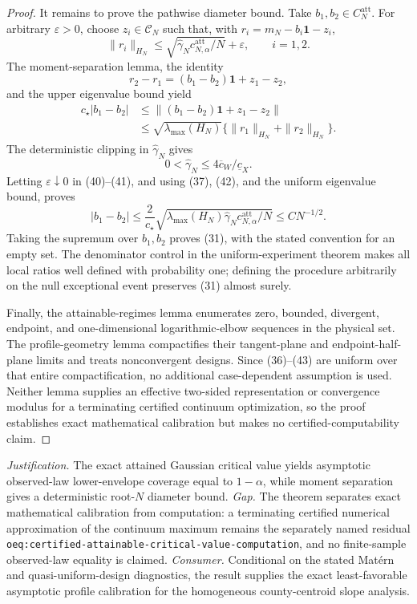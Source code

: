 \documentclass{article}
\begin{document}
\begin{proof}
It remains to prove the pathwise diameter bound.  Take \(b_1,b_2\in C_N^{\mathrm{att}}\).  For arbitrary \(\varepsilon>0\), choose \(z_i\in\mathcal C_N\) such that, with \(r_i=m_N-b_i\mathbf1-z_i\),
\[
\|r_i\|_{H_N}\le
\sqrt{\widehat\gamma_Nc_{N,\alpha}^{\mathrm{att}}/N}+\varepsilon,
\qquad i=1,2.                                                                \tag{40}
\]
The moment-separation lemma, the identity
\[
r_2-r_1=(b_1-b_2)\mathbf1+z_1-z_2,
\]
and the upper eigenvalue bound yield
\[
\begin{aligned}
c_\star|b_1-b_2|
&\le\|(b_1-b_2)\mathbf1+z_1-z_2\|\\
&\le\sqrt{\lambda_{\max}(H_N)}
   \{\|r_1\|_{H_N}+\|r_2\|_{H_N}\}.                                      \tag{41}
\end{aligned}
\]
The deterministic clipping in \(\widehat\gamma_N\) gives
\[
0<\widehat\gamma_N\le4\overline c_W/\underline c_X.                        \tag{42}
\]
Letting \(\varepsilon\downarrow0\) in (40)--(41), and using (37), (42), and the uniform eigenvalue bound, proves
\[
|b_1-b_2|\le
\frac{2}{c_\star}
\sqrt{\lambda_{\max}(H_N)\widehat\gamma_N
      c_{N,\alpha}^{\mathrm{att}}/N}
\le C N^{-1/2}.                                                               \tag{43}
\]
Taking the supremum over \(b_1,b_2\) proves (31), with the stated convention for an empty set.  The denominator control in the uniform-experiment theorem makes all local ratios well defined with probability one; defining the procedure arbitrarily on the null exceptional event preserves (31) almost surely.

Finally, the attainable-regimes lemma enumerates zero, bounded, divergent, endpoint, and one-dimensional logarithmic-elbow sequences in the physical set.  The profile-geometry lemma compactifies their tangent-plane and endpoint-half-plane limits and treats nonconvergent designs.  Since (36)--(43) are uniform over that entire compactification, no additional case-dependent assumption is used.  Neither lemma supplies an effective two-sided representation or convergence modulus for a terminating certified continuum optimization, so the proof establishes exact mathematical calibration but makes no certified-computability claim.
\end{proof}
\par\smallskip\noindent \textit{Justification.} The exact attained Gaussian critical value yields asymptotic observed-law lower-envelope coverage equal to \(1-\alpha\), while moment separation gives a deterministic root-\(N\) diameter bound. \textit{Gap.} The theorem separates exact mathematical calibration from computation: a terminating certified numerical approximation of the continuum maximum remains the separately named residual \texttt{oeq:certified-attainable-critical-value-computation}, and no finite-sample observed-law equality is claimed. \textit{Consumer.} Conditional on the stated Mat\'ern and quasi-uniform-design diagnostics, the result supplies the exact least-favorable asymptotic profile calibration for the homogeneous county-centroid slope analysis.
\end{document}

